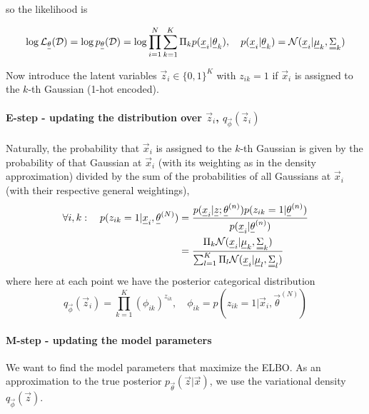 so the likelihood is

\begin{equation}
    \log \mathcal{L}_{\vec{\theta}}(\mathcal{D}) = \log p_{\vec{\theta}}(\mathcal{D}) = \log \prod_{i=1}^{N} \sum_{k=1}^{K} \Pi_k p(\vec{x}_i | \vec{\theta}_k), \quad p(\vec{x}_i | \vec{\theta}_k) = \mathcal{N}(\vec{x}_i | \vec{\mu}_k, \mat{\Sigma}_k)
\end{equation}

Now introduce the latent variables $\vec{z}_i \in \{0,1\}^K$ with $z_{ik} = 1$ if $\vec{x}_i$ is assigned to the $k$-th Gaussian
(1-hot encoded).

\paragraph*{E-step - updating the distribution over $\vec{z}_i$, $q_\vec{\phi}(\vec{z}_i)$} Naturally, the probability that $\vec{x}_i$ is assigned to the $k$-th Gaussian is given by
the probability of that Gaussian at $\vec{x}_i$ (with its weighting as in the density approximation) divided by the sum of the probabilities of all Gaussians at $\vec{x}_i$ (with their respective
general weightings),
\begin{equation}
    \begin{aligned}
        \forall i,k: \quad p(z_{ik} = 1 | \vec{x}_i, \vec{\theta}^{(N)}) &= \frac{p(\vec{x}_i|\vec{z};\vec{\theta}^{(n)}) p(z_{ik} = 1 | \vec{\theta}^{(n)})}{p(\vec{x}_i | \vec{\theta}^{(n)})} \\
        &= \frac{\Pi_k \mathcal{N}(\vec{x}_i | \vec{\mu}_k, \mat{\Sigma}_k)}{\sum_{l=1}^{K} \Pi_l \mathcal{N}(\vec{x}_i | \vec{\mu}_l, \mat{\Sigma}_l)}
    \end{aligned}
\end{equation}
where here at each point we have the posterior categorical distribution
\begin{equation}
    q_{\vec{\phi}}(\vec{z}_i) = \prod_{k=1}^{K} \left( \phi_{ik} \right)^{z_{ik}}, \quad \phi_{ik} = p\left(z_{ik} = 1 | \vec{x}_i, \vec{\theta}^{(N)}\right)
\end{equation}

\paragraph*{M-step - updating the model parameters} We want to find the model parameters that maximize the ELBO. As an approximation
to the true posterior $p_{\vec{\theta}}(\vec{z} | \vec{x})$, we use the variational density $q_{\vec{\phi}}(\vec{z})$.

